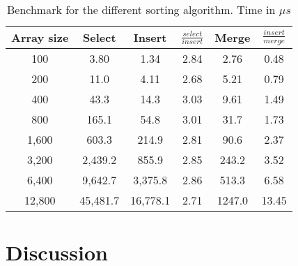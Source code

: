 \documentclass[a4paper,11pt]{article}
\begin{document}
\begin{table}[h!]
    \begin{center}
        \begin{tabular}{|c|c|c|c|c|c|}
            \hline
            \textbf{Array size} & \textbf{Select} & \textbf{Insert} & \textbf{$\frac{select}{insert}$} & \textbf{Merge} & \textbf{$\frac{insert}{merge}$} \\
            \hline
            100                 & 3.80            & 1.34            & 2.84                             & 2.76           & 0.48                            \\
            200                 & 11.0            & 4.11            & 2.68                             & 5.21           & 0.79                            \\
            400                 & 43.3            & 14.3            & 3.03                             & 9.61           & 1.49                            \\
            800                 & 165.1           & 54.8            & 3.01                             & 31.7           & 1.73                            \\
            1,600               & 603.3           & 214.9           & 2.81                             & 90.6           & 2.37                            \\
            3,200               & 2,439.2         & 855.9           & 2.85                             & 243.2          & 3.52                            \\
            6,400               & 9,642.7         & 3,375.8         & 2.86                             & 513.3          & 6.58                            \\
            12,800              & 45,481.7        & 16,778.1        & 2.71                             & 1247.0         & 13.45                           \\
            \hline
        \end{tabular}
        \caption{Benchmark for the different sorting algorithm. Time in $\mu s$}
        \label{tab:benchmark}
    \end{center}
\end{table}

\section*{Discussion}
\end{document}
